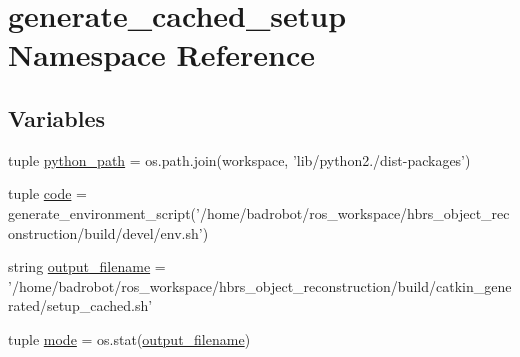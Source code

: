 \hypertarget{namespacegenerate__cached__setup}{\section{generate\-\_\-cached\-\_\-setup \-Namespace \-Reference}
\label{namespacegenerate__cached__setup}
}
\subsection*{\-Variables}
\begin{DoxyCompactItemize}
\item 
tuple \hyperlink{namespacegenerate__cached__setup_ac7cb1f0b129964a1aeec5a473feffaf7}{python\-\_\-path} = os.\-path.\-join(workspace, 'lib/python2./dist-\/packages')
\item 
tuple \hyperlink{namespacegenerate__cached__setup_addcec96a295a686731bd38e0d17c22fa}{code} = generate\-\_\-environment\-\_\-script('/home/badrobot/ros\-\_\-workspace/hbrs\-\_\-object\-\_\-reconstruction/build/devel/env.\-sh')
\item 
string \hyperlink{namespacegenerate__cached__setup_ab8af5b5c03c4c054bff5d246d632a5d8}{output\-\_\-filename} = '/home/badrobot/ros\-\_\-workspace/hbrs\-\_\-object\-\_\-reconstruction/build/catkin\-\_\-generated/setup\-\_\-cached.\-sh'
\item 
tuple \hyperlink{namespacegenerate__cached__setup_ab69771980c7a74aa5a3c182fe4bf16d8}{mode} = os.\-stat(\hyperlink{namespacegenerate__cached__setup_ab8af5b5c03c4c054bff5d246d632a5d8}{output\-\_\-filename})
\end{DoxyCompactItemize}


